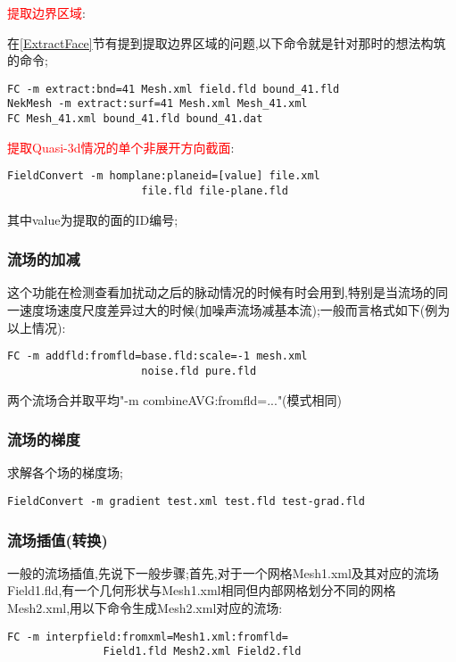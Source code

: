 \textcolor{red}{提取边界区域}:\par
在\ref{ExtractFace}节有提到提取边界区域的问题,以下命令就是针对那时的想法构筑的命令;\par
\begin{lstlisting}[frame=single]
FC -m extract:bnd=41 Mesh.xml field.fld bound_41.fld
NekMesh -m extract:surf=41 Mesh.xml Mesh_41.xml
FC Mesh_41.xml bound_41.fld bound_41.dat
\end{lstlisting}

\textcolor{red}{提取Quasi-3d情况的单个非展开方向截面}:\par
\begin{lstlisting}[frame=single]
FieldConvert -m homplane:planeid=[value] file.xml 
				     file.fld file-plane.fld
\end{lstlisting}
\par
其中value为提取的面的ID编号;


\subsubsection{流场的加减}
这个功能在检测查看加扰动之后的脉动情况的时候有时会用到,特别是当流场的同一速度场速度尺度差异过大的时候(加噪声流场减基本流);一般而言格式如下(例为以上情况):\par

\begin{lstlisting}[frame=single]
FC -m addfld:fromfld=base.fld:scale=-1 mesh.xml
					 noise.fld pure.fld
\end{lstlisting}
两个流场合并取平均"-m combineAVG:fromfld=..."(模式相同)


\subsubsection{流场的梯度}
求解各个场的梯度场;\par
\begin{lstlisting}[frame=single]
FieldConvert -m gradient test.xml test.fld test-grad.fld
\end{lstlisting}


\subsubsection{流场插值(转换)}
一般的流场插值,先说下一般步骤;首先,对于一个网格Mesh1.xml及其对应的流场Field1.fld,有一个几何形状与Mesh1.xml相同但内部网格划分不同的网格Mesh2.xml,用以下命令生成Mesh2.xml对应的流场:\par
\begin{lstlisting}[frame=single]
FC -m interpfield:fromxml=Mesh1.xml:fromfld=
			   Field1.fld Mesh2.xml Field2.fld
\end{lstlisting}

